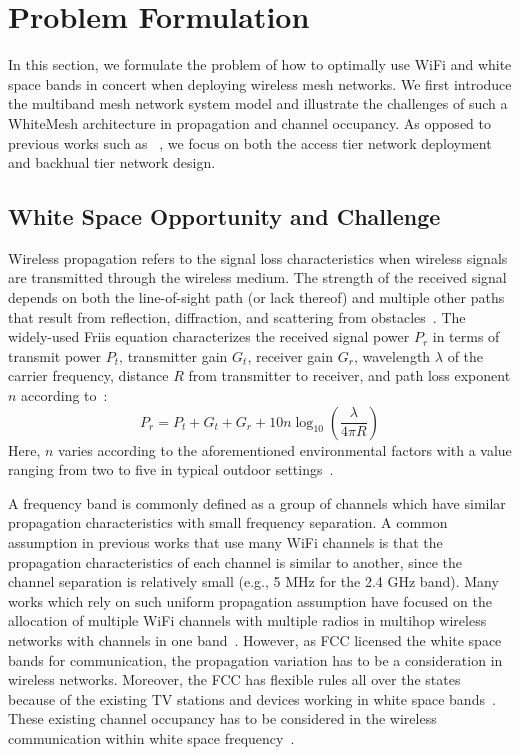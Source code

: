 \section{Problem Formulation}
\label{sec:problemformulation}

In this section, we formulate the problem of how to optimally use WiFi and white space bands 
in concert when deploying wireless mesh networks. We first introduce the multiband mesh 
network system model and illustrate the challenges of such a WhiteMesh architecture in 
propagation and channel occupancy. As opposed to previous works such as
~\cite{tang2005interference,yuan2006cross,si2010overview}, we focus on both the access tier 
network deployment and backhual tier network design. 

\subsection{White Space Opportunity and Challenge}
\label{subsec:motivation}
Wireless propagation refers to the signal loss characteristics when wireless signals 
are transmitted through the wireless medium. The strength of the received signal 
depends on both the line-of-sight path (or lack thereof) and multiple other paths 
that result from reflection, diffraction, and scattering from obstacles~\cite{andersen1995propagation}. 
The widely-used Friis equation characterizes the received signal power $P_r$ in terms 
of transmit power $P_t$, transmitter gain $G_t$, receiver gain $G_r$, wavelength 
$\lambda$ of the carrier frequency, distance $R$ from transmitter to receiver, and 
path loss exponent $n$ according to~\cite{friis}:
\begin{equation}
\label{eq:friis}
P_r=P_t+G_t+G_r+10n \log_{10}\left( \frac{\lambda}{4\pi R}\right)
\end{equation}
Here, $n$ varies according to the aforementioned environmental factors with a value 
ranging from two to five in typical outdoor settings~\cite{rappaport}.

A frequency band is commonly defined as a group of channels which have similar propagation 
characteristics with small frequency separation. A common assumption in previous works that 
use many WiFi channels is that the propagation characteristics of each channel is similar 
to another, since the channel separation is relatively small (e.g., 5 MHz for the 2.4 GHz band).
Many works which rely on such uniform propagation assumption have focused on the allocation 
of multiple WiFi channels with multiple radios in multihop wireless networks with channels in 
one band~\cite{doraghinejad2014channel}. However, as FCC licensed the white space bands for 
communication, the propagation variation has to be a consideration in wireless networks. 
Moreover, the FCC has flexible rules all over the states because of the existing TV stations 
and devices working in white space bands~\cite{googledatabase}. These existing channel occupancy 
has to be considered in the wireless communication within white space frequency~\cite{fallah2010congestion}. 


